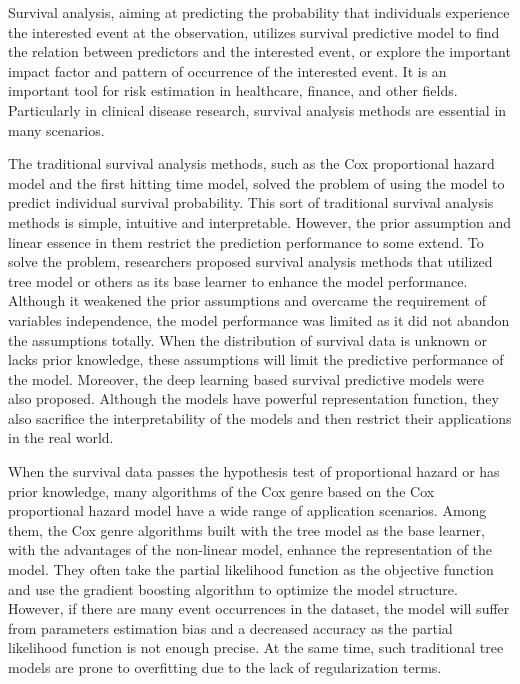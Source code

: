 
\begin{englishabstract}
	Survival analysis, aiming at predicting the probability that individuals experience the interested event at the observation, utilizes survival predictive model to find the relation between predictors and the interested event, or explore the important impact factor and pattern of occurrence of the interested event. It is an important tool for risk estimation in healthcare, finance, and other fields. Particularly in clinical disease research, survival analysis methods are essential in many scenarios.
	
	The traditional survival analysis methods, such as the Cox proportional hazard model and the first hitting time model, solved the problem of using the model to predict individual survival probability. This sort of traditional survival analysis methods is simple, intuitive and interpretable. However, the prior assumption and linear essence in them restrict the prediction performance to some extend. To solve the problem, researchers proposed survival analysis methods that utilized tree model or others as its base learner to enhance the model performance. Although it weakened the prior assumptions and overcame the requirement of variables independence, the model performance was limited as it did not abandon the assumptions totally. When the distribution of survival data is unknown or lacks prior knowledge, these assumptions will limit the predictive performance of the model. Moreover, the deep learning based survival predictive models were also proposed. Although the models have powerful representation function, they also sacrifice the interpretability of the models and then restrict their applications in the real world.

    When the survival data passes the hypothesis test of proportional hazard or has prior knowledge, many algorithms of the Cox genre based on the Cox proportional hazard model have a wide range of application scenarios. Among them, the Cox genre algorithms built with the tree model as the base learner, with the advantages of the non-linear model, enhance the representation of the model. They often take the partial likelihood function as the objective function and use the gradient boosting algorithm to optimize the model structure. However, if there are many event occurrences in the dataset, the model will suffer from parameters estimation bias and a decreased accuracy as the partial likelihood function is not enough precise. At the same time, such traditional tree models are prone to overfitting due to the lack of regularization terms.


\end{englishabstract}
